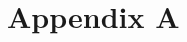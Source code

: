 \documentclass[11pt]{diazessay} %
\begin{document}

\clearpage
%



\pagebreak
\section*{Appendix A}


\end{document}
